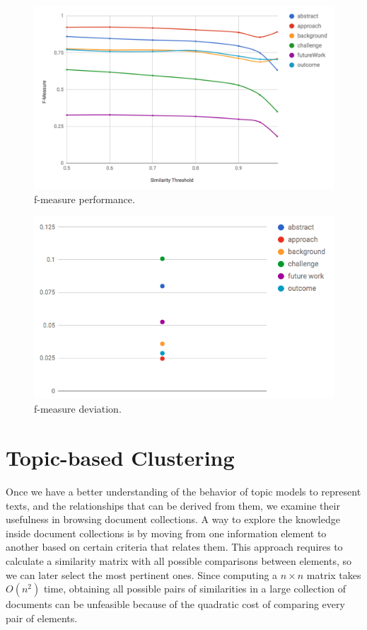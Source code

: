 \begin{figure}[!htbp]
  \center
  \includegraphics[scale=0.4]{fmeasure.png}
  \caption{f-measure performance.}
  \label{fig:fmeasure}
\end{figure}

\begin{figure}[!htbp]
  \center
  \includegraphics[scale=0.4]{stdeviation.png}
  \caption{f-measure deviation.}
  \label{fig:stdeviation}
\end{figure}


\section{Topic-based Clustering}
\label{sec:topic-clustering}

Once we have a better understanding of the behavior of topic models to represent texts, and the relationships that can be derived from them, we examine their usefulness in browsing document collections. A way to explore the knowledge inside document collections is by moving from one information element to another based on certain criteria that relates them. This approach requires to calculate a similarity matrix with all possible comparisons between elements, so we can later select the most pertinent ones. Since computing a $n \times n$ matrix takes $O(n^2)$ time, obtaining all possible pairs of similarities in a large collection of documents can be unfeasible because of the quadratic cost of comparing every pair of elements.

